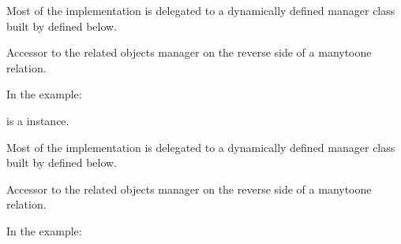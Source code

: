 \documentclass[letterpaper,10pt,english]{sphinxmanual}
\begin{document}
\begin{fulllineitems}
\begin{fulllineitems}
Most of the implementation is delegated to a dynamically defined manager
class built by  defined below.

\end{fulllineitems}


\begin{fulllineitems}
\label{\detokenize{accounts:accounts.models.User.main_member}}
Accessor to the related objects manager on the reverse side of a
many\sphinxhyphen{}to\sphinxhyphen{}one relation.

In the example:

\begin{sphinxVerbatim}[commandchars=\\\{\}]
 
       
\end{sphinxVerbatim}

 is a  instance.

Most of the implementation is delegated to a dynamically defined manager
class built by  defined below.

\end{fulllineitems}


\begin{fulllineitems}
\label{\detokenize{accounts:accounts.models.User.memberorganisation_set}}
Accessor to the related objects manager on the reverse side of a
many\sphinxhyphen{}to\sphinxhyphen{}one relation.

In the example:

\begin{sphinxVerbatim}[commandchars=\\\{\}]
 
       
\end{sphinxVerbatim}


\end{fulllineitems}
\end{fulllineitems}
\end{document}
